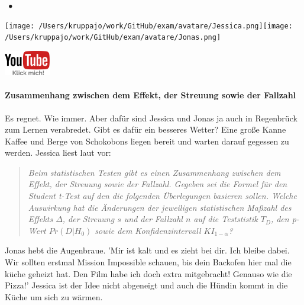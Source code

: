 \documentclass[a4paper, 9pt]{scrartcl}\usepackage[]{graphicx}\usepackage[]{xcolor}
\begin{document}
 
\ifcollection
\begin{flushright}
\tiny\vspace{-3Ex}
\textbf{\examinhaltstart}
\exammodulestatversuch $\;\bullet$
\exammodulebiostat
\vspace{-4Ex}
\end{flushright}
\begin{minipage}[t]{0.5\textwidth}
\texttt{[image: /Users/kruppajo/work/GitHub/exam/avatare/Jessica.png]}\hspace{-4mm}\texttt{[image: /Users/kruppajo/work/GitHub/exam/avatare/Jonas.png]}
\end{minipage}
\begin{minipage}[t]{0.5\textwidth}
\hfill
\href{https://youtu.be/FgZmpnEWDag}{\includegraphics[width = 2cm]{img/youtube}}
\end{minipage}
\fi



\ifcollection
\paragraph{Zusammenhang zwischen dem Effekt, der Streuung sowie der Fallzahl}
\fi

Es regnet. Wie immer. Aber dafür sind Jessica und Jonas ja auch in Regenbrück zum Lernen verabredet. Gibt es dafür ein besseres Wetter? Eine große Kanne Kaffee und Berge von Schokobons liegen bereit und warten darauf gegessen zu werden. Jessica liest laut vor:\begin{quote}
                 \textit{
                 Beim statistischen Testen gibt es einen Zusammenhang zwischen dem Effekt, der Streuung sowie der Fallzahl. Gegeben sei die Formel für den Student t-Test auf den die folgenden Überlegungen basieren sollen. Welche Auswirkung hat die Änderungen der jeweiligen statistischen Maßzahl des Effekts $\Delta$, der Streuung $s$ und der Fallzahl $n$ auf die Teststistik $T_{D}$, den p-Wert $Pr(D|H_0)$ sowie dem Konfidenzintervall $KI_{1-\alpha}$?
                 }
                 \end{quote}Jonas hebt die Augenbraue. 'Mir ist kalt und es zieht bei dir. Ich bleibe dabei. Wir sollten erstmal Mission Impossible schauen, bis dein Backofen hier mal die küche geheizt hat. Den Film habe ich doch extra mitgebracht! Genauso wie die Pizza!' Jessica ist der Idee nicht abgeneigt und auch die Hündin kommt in die Küche um sich zu wärmen.
\end{document}
